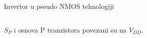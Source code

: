 \begin{frame}[label=09_2-s011]{Invertor u pseudo NMOS tehnologiji}
\begin{columns}[c,onlytextwidth]\centering {}\centering {}\centering \end{columns}\par\vspace{4mm}\centering $S_P$ i osnova P tranzistora povezani su na $V_{DD}$.
\end{frame}
